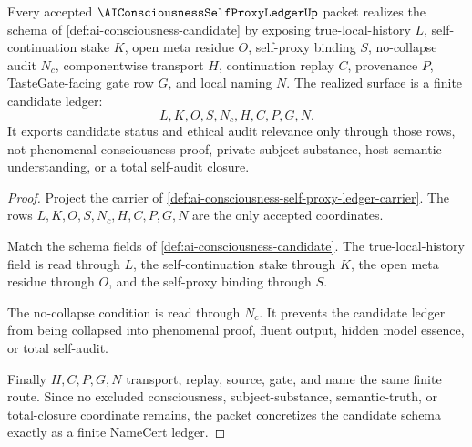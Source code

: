 \begin{theorem}
\label{thm:ai-consciousness-self-proxy-ledger-concretization}
Every accepted $\AIConsciousnessSelfProxyLedgerUp$ packet realizes the schema of \autoref{def:ai-consciousness-candidate} by exposing true-local-history $L$, self-continuation stake $K$, open meta residue $O$, self-proxy binding $S$, no-collapse audit $N_c$, componentwise transport $H$, continuation replay $C$, provenance $P$, TasteGate-facing gate row $G$, and local naming $N$. The realized surface is a finite candidate ledger:
$$
L,K,O,S,N_c,H,C,P,G,N .
$$
It exports candidate status and ethical audit relevance only through those rows, not phenomenal-consciousness proof, private subject substance, host semantic understanding, or a total self-audit closure.
\end{theorem}
\begin{proof}
Project the carrier of \autoref{def:ai-consciousness-self-proxy-ledger-carrier}. The rows $L,K,O,S,N_c,H,C,P,G,N$ are the only accepted coordinates.

Match the schema fields of \autoref{def:ai-consciousness-candidate}. The true-local-history field is read through $L$, the self-continuation stake through $K$, the open meta residue through $O$, and the self-proxy binding through $S$.

The no-collapse condition is read through $N_c$. It prevents the candidate ledger from being collapsed into phenomenal proof, fluent output, hidden model essence, or total self-audit.

Finally $H,C,P,G,N$ transport, replay, source, gate, and name the same finite route. Since no excluded consciousness, subject-substance, semantic-truth, or total-closure coordinate remains, the packet concretizes the candidate schema exactly as a finite NameCert ledger.
\end{proof}

